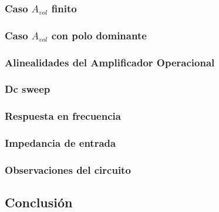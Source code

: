 \documentclass[../../main.tex]{subfiles}
\begin{document}
\subsubsection{Caso $A_{vol}$ finito}
\subsubsection{Caso $A_{vol}$  con polo dominante}
\subsubsection{Alinealidades del Amplificador Operacional}
\subsubsection{Dc sweep}
\subsubsection{Respuesta en frecuencia}
\subsubsection{Impedancia de entrada}
\subsubsection{Observaciones del circuito}

\subsection{Conclusión}
\end{document}
